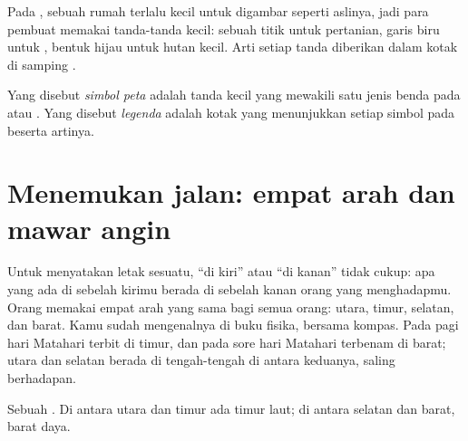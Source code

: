 Pada , sebuah rumah terlalu kecil untuk digambar seperti aslinya, jadi
para pembuat  memakai tanda-tanda kecil: sebuah titik untuk pertanian,
garis biru untuk , bentuk hijau untuk hutan kecil. Arti setiap tanda
diberikan dalam kotak di samping .

\begin{definition}[Legenda]\label{def:g2:drawing-to-map:legend}
Yang disebut \emph{simbol peta} adalah tanda kecil yang
mewakili satu jenis benda pada  atau . Yang disebut
\emph{legenda} adalah kotak yang menunjukkan setiap simbol
pada  beserta artinya.
\end{definition}

\section{Menemukan jalan: empat arah dan mawar angin}

Untuk menyatakan letak sesuatu, ``di kiri'' atau ``di kanan'' tidak cukup:
apa yang ada di sebelah kirimu berada di sebelah kanan orang yang
menghadapmu. Orang memakai empat arah yang sama bagi semua orang: utara,
timur, selatan, dan barat. Kamu sudah mengenalnya di buku fisika, bersama
kompas. Pada pagi hari Matahari terbit di timur, dan pada sore hari
Matahari terbenam di barat; utara dan selatan berada di tengah-tengah di
antara keduanya, saling berhadapan.

\begin{omfigure}

{\small Sebuah . Di antara utara dan timur ada timur laut; di
antara selatan dan barat, barat daya.}
\label{fig:g2:drawing-to-map:rose}
\end{omfigure}

